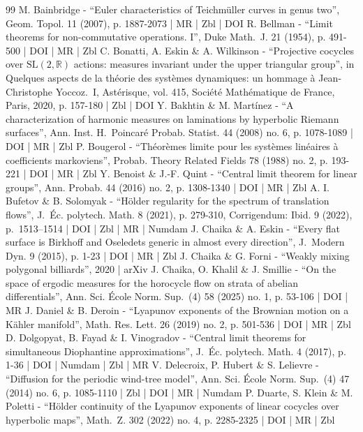 \documentclass[10pt]{amsart}
\theoremstyle{plain}
\theoremstyle{definition}
\numberwithin{equation}{subsection}
\begin{document}
\begin{thebibliography}{99}
M. Bainbridge - “Euler characteristics of Teichmüller curves in genus two”, Geom. Topol. 11 (2007), p. 1887-2073 | MR | Zbl | DOI
R. Bellman - “Limit theorems for non-commutative operations. I”, Duke Math. J. 21 (1954), p. 491-500 | DOI | MR | Zbl
C. Bonatti, A. Eskin \& A. Wilkinson - “Projective cocycles over $\mathrm{SL}(2,\mathbb{R})$ actions: measures invariant under the upper triangular group”, in Quelques aspects de la théorie des systèmes dynamiques: un hommage à Jean-Christophe Yoccoz. I, Astérisque, vol. 415, Société Mathématique de France, Paris, 2020, p. 157-180 | Zbl | DOI
Y. Bakhtin \& M. Martínez - “A characterization of harmonic measures on laminations by hyperbolic Riemann surfaces”, Ann. Inst. H. Poincaré Probab. Statist. 44 (2008) no. 6, p. 1078-1089 | DOI | MR | Zbl
P. Bougerol - “Théorèmes limite pour les systèmes linéaires à coefficients markoviens”, Probab. Theory Related Fields 78 (1988) no. 2, p. 193-221 | DOI | MR | Zbl
Y. Benoist \& J.-F. Quint - “Central limit theorem for linear groups”, Ann. Probab. 44 (2016) no. 2, p. 1308-1340 | DOI | MR | Zbl
A. I. Bufetov \& B. Solomyak - “Hölder regularity for the spectrum of translation flows”, J. Éc. polytech. Math. 8 (2021), p. 279-310, Corrigendum: Ibid. 9 (2022), p. 1513–1514 | DOI | Zbl | MR | Numdam
J. Chaika \& A. Eskin - “Every flat surface is Birkhoff and Oseledets generic in almost every direction”, J. Modern Dyn. 9 (2015), p. 1-23 | DOI | MR | Zbl
J. Chaika \& G. Forni - “Weakly mixing polygonal billiards”, 2020 | arXiv
J. Chaika, O. Khalil \& J. Smillie - “On the space of ergodic measures for the horocycle flow on strata of abelian differentials”, Ann. Sci. École Norm. Sup. (4) 58 (2025) no. 1, p. 53-106 | DOI | MR
J. Daniel \& B. Deroin - “Lyapunov exponents of the Brownian motion on a Kähler manifold”, Math. Res. Lett. 26 (2019) no. 2, p. 501-536 | DOI | MR | Zbl
D. Dolgopyat, B. Fayad \& I. Vinogradov - “Central limit theorems for simultaneous Diophantine approximations”, J. Éc. polytech. Math. 4 (2017), p. 1-36 | DOI | Numdam | Zbl | MR
V. Delecroix, P. Hubert \& S. Lelievre - “Diffusion for the periodic wind-tree model”, Ann. Sci. École Norm. Sup. (4) 47 (2014) no. 6, p. 1085-1110 | Zbl | DOI | MR | Numdam
P. Duarte, S. Klein \& M. Poletti - “Hölder continuity of the Lyapunov exponents of linear cocycles over hyperbolic maps”, Math. Z. 302 (2022) no. 4, p. 2285-2325 | DOI | MR | Zbl

\end{thebibliography}
\end{document}
